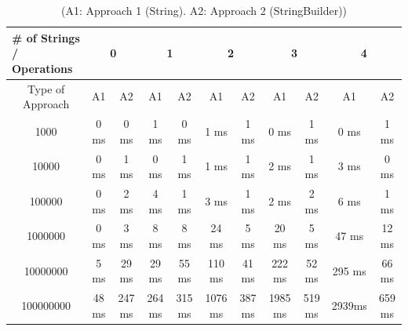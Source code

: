 \documentclass[a4paper]{article}
\begin{document}
\begin{table}[htbp]
\centering
\tiny
\setlength\tabcolsep{2pt}
\begin{tabular}{|c|cc|cc|cc|cc|cc|}
\hline
\multicolumn{1}{|l|}{\# of Strings / Operations} & \multicolumn{2}{c|}{0}        & \multicolumn{2}{c|}{1}         & \multicolumn{2}{c|}{2}          & \multicolumn{2}{c|}{3}          & \multicolumn{2}{c|}{4}          \\ \hline
Type of Approach                                               & \multicolumn{1}{c|}{A1} & A2  & \multicolumn{1}{c|}{A1}  & A2  & \multicolumn{1}{c|}{A1}   & A2  & \multicolumn{1}{c|}{A1}   & A2  & \multicolumn{1}{c|}{A1}   & A2  \\ \hline
1000                                                           & \multicolumn{1}{c|}{0 ms}  & 0 ms  & \multicolumn{1}{c|}{1 ms}   & 0 ms  & \multicolumn{1}{c|}{1 ms}    & 1 ms  & \multicolumn{1}{c|}{0 ms}    & 1 ms  & \multicolumn{1}{c|}{0 ms}    & 1 ms  \\ \hline
10000                                                          & \multicolumn{1}{c|}{0 ms}  & 1 ms  & \multicolumn{1}{c|}{0 ms}   & 1 ms  & \multicolumn{1}{c|}{1 ms}    & 1 ms  & \multicolumn{1}{c|}{2 ms}    & 1 ms  & \multicolumn{1}{c|}{3 ms}    & 0 ms  \\ \hline
100000                                                         & \multicolumn{1}{c|}{0 ms}  & 2 ms  & \multicolumn{1}{c|}{4 ms}   & 1 ms  & \multicolumn{1}{c|}{3 ms}    & 1 ms  & \multicolumn{1}{c|}{2 ms}    & 2 ms  & \multicolumn{1}{c|}{6 ms}    & 1 ms  \\ \hline
1000000                                                        & \multicolumn{1}{c|}{0 ms}  & 3 ms  & \multicolumn{1}{c|}{8 ms}   & 8 ms  & \multicolumn{1}{c|}{24 ms}   & 5 ms  & \multicolumn{1}{c|}{20 ms}   & 5 ms  & \multicolumn{1}{c|}{47 ms}   & 12 ms \\ \hline
10000000                                                       & \multicolumn{1}{c|}{5 ms}  & 29 ms & \multicolumn{1}{c|}{29 ms}  & 55 ms & \multicolumn{1}{c|}{110 ms}  & 41 ms & \multicolumn{1}{c|}{222 ms}  & 52 ms & \multicolumn{1}{c|}{295 ms}  & 66 ms \\ \hline
100000000                                                      & \multicolumn{1}{c|}{48 ms} & 247 ms & \multicolumn{1}{c|}{264 ms} & 315 ms & \multicolumn{1}{c|}{1076 ms} & 387 ms & \multicolumn{1}{c|}{1985 ms} & 519 ms & \multicolumn{1}{c|}{2939ms} & 659 ms \\ \hline
\end{tabular}
\captionsetup{justification=centering}
\caption*{(A1: Approach 1 (String). A2: Approach 2 (StringBuilder))}
\end{table}
\end{document}
